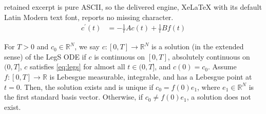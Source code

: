 \documentclass[10pt,a4paper]{amsart}
\newcommand{\derivative}[1]{#1^{\prime}}
\begin{document}
retained excerpt is pure ASCII, so the delivered engine, XeLaTeX with its default Latin Modern text font, reports no missing character.
\begin{align}   \label{eq:legs} %
    \derivative{c}(t) &= -\frac{1}{t}Ac(t) + \frac{1}{t}Bf(t) 
\end{align}

\begin{theorem} \label{thm:exist and unique}
    For $T>0$ and $c_0 \in \mathbb{R}^N$, we say $c\colon [0,T]\rightarrow \mathbb R^N$ is a solution (in the extended sense) of the LegS ODE if $c$ is
    continuous on $[0,T]$,
    absolutely continuous on $(0,T]$, $c$ satisfies \eqref{eq:legs} for almost all $t \in (0,T]$, and $c(0) = c_0$.
    Assume $f\colon [0,T]\rightarrow \mathbb R$ is Lebesgue measurable, integrable, and 
    has a Lebesgue point at $t=0$. 
    Then, the solution exists and is unique if $c_0 = f(0)e_1$, where $e_1\in \mathbb{R}^N$ is the first standard basis vector.
    Otherwise, if $c_0 \ne  f(0)e_1$, a solution does not exist.
\end{theorem}
\end{document}
